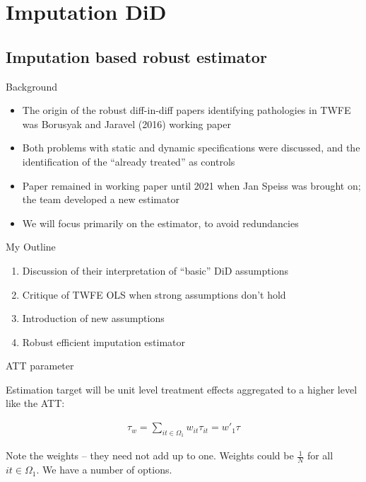 \documentclass{beamer}
\begin{document}



\section{Imputation DiD}

\subsection{Imputation based robust estimator}



\begin{frame}{Background}

\begin{itemize}

\item The origin of the robust diff-in-diff papers identifying pathologies in TWFE was Borusyak and Jaravel (2016) working paper
\item Both problems with static and dynamic specifications were discussed, and the identification of the ``already treated'' as controls
\item Paper remained in working paper until 2021 when Jan Speiss was brought on; the team developed a new estimator
\item We will focus primarily on the estimator, to avoid redundancies

\end{itemize}

\end{frame}

\begin{frame}{My Outline}

\begin{enumerate}
\item Discussion of their interpretation of ``basic'' DiD assumptions
\item Critique of TWFE OLS when strong assumptions don't hold
\item Introduction of new assumptions
\item Robust efficient imputation estimator
\end{enumerate}

\end{frame}


\begin{frame}{ATT parameter}

Estimation target will be unit level treatment effects aggregated to a higher level like the ATT:

\begin{eqnarray*}
\tau_w = \sum_{it \in \Omega_{1}}w_{it}\tau_{it} = w'_1\tau
\end{eqnarray*}

\bigskip

Note the weights -- they need not add up to one.  Weights could be $\frac{1}{N}$ for all $it \in \Omega_1$. We have a number of options. 


\end{frame}
\end{document}
